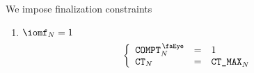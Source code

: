 We impose finalization constraints
\begin{enumerate}
	\item \If $\iomf _{N} = 1$ \Then
		\[
			\left\{ \begin{array}{lcl}
				\isRlpUtilsCompt _{N} & = & 1           \\
				\ct              _{N} & = & \maxCt _{N} \\
			\end{array} \right.
		\]
\end{enumerate}
